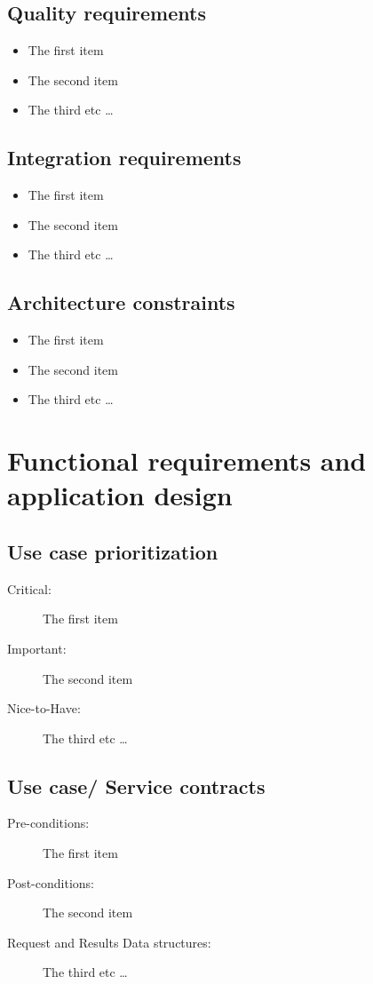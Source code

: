 \documentclass{article}
\begin{document}
	\subsection {Quality requirements}
		\begin{itemize}
		  \item The first item
		  \item The second item
		  \item The third etc \ldots
		\end{itemize}
		
	\subsection {Integration requirements}
		\begin{itemize}
		  \item The first item
		  \item The second item
		  \item The third etc \ldots
		\end{itemize}
		
	\subsection {Architecture constraints}
		\begin{itemize}
		  \item The first item
		  \item The second item
		  \item The third etc \ldots
		\end{itemize}
		
	\section{Functional requirements and application design}
		\subsection{Use case prioritization}
			\begin{description}
			  \item[Critical:] The first item
			  \item[Important:] The second item
			  \item[Nice-to-Have:] The third etc \ldots
			\end{description}
			
		\subsection{Use case/ Service contracts}
			\begin{description}
			  \item[Pre-conditions:] The first item
			  \item[Post-conditions:] The second item
			  \item[Request and Results Data structures:] The third etc \ldots
			\end{description}
			
\end{document}
